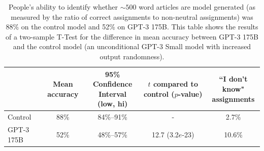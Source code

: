 \begin{table}
    \centering
        \begin{tabular}{l c c c c}
        \toprule
         & Mean accuracy & \shortstack{95\% Confidence \\Interval (low, hi)} & \shortstack{$t$ compared to \\ control ($p$-value)} & \shortstack{``I don't know" \\ assignments} \\ 
        \midrule
Control & 88\% & 84\%–91\% & - & 2.7\% \\ 
GPT-3 175B   & 52\% & 48\%–57\% & 12.7 (3.2$e$-23) & 10.6\% \\ 
        \bottomrule
        \end{tabular}
    \caption{People’s ability to identify whether $\sim500$ word articles are model generated (as measured by the ratio of correct assignments to non-neutral assignments) was 88\% on the control model and 52\% on GPT-3 175B. This table shows the results of a two-sample T-Test for the difference in mean accuracy between GPT-3 175B and the control model (an unconditional GPT-3 Small model with increased output randomness).}
    \label{table:generation_long}
\end{table}